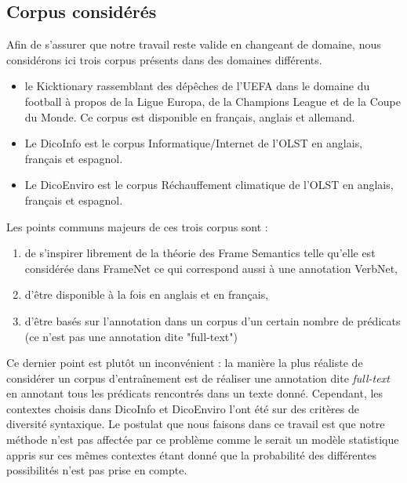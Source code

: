 \subsection{Corpus considérés}

Afin de s'assurer que notre travail reste valide en changeant de domaine, nous
considérons ici trois corpus présents dans des domaines différents.

\begin{itemize}

    \item le Kicktionary \citep{schmidt2009kicktionary} rassemblant des
        dépêches de l'UEFA dans le domaine du football à propos de la Ligue
        Europa, de la Champions League et de la Coupe du Monde. Ce corpus est
        disponible en français, anglais et allemand.

    \item Le DicoInfo est le corpus Informatique/Internet de l'OLST
        \citep{olstcorpus} en anglais, français et espagnol.

    \item Le DicoEnviro est le corpus Réchauffement climatique de l'OLST
        \citep{olstcorpus} en anglais, français et espagnol.

\end{itemize}

Les points communs majeurs de ces trois corpus sont :
\begin{enumerate}

    \item de s'inspirer librement de la théorie des Frame Semantics telle
        qu'elle est considérée dans FrameNet ce qui correspond aussi à une
        annotation VerbNet,

    \item d'être disponible à la fois en anglais et en français,

    \item d'être basés sur l'annotation dans un corpus d'un certain nombre de
        prédicats (ce n'est pas une annotation dite "full-text")

\end{enumerate}

Ce dernier point est plutôt un inconvénient : la manière la plus réaliste de
considérer un corpus d'entraînement est de réaliser une annotation dite
\textit{full-text} en annotant tous les prédicats rencontrés dans un texte
donné. Cependant, les contextes choisis dans DicoInfo et DicoEnviro l'ont été
sur des critères de diversité syntaxique. \citep{lhomme2012adding} Le postulat
que nous faisons dans ce travail est que notre méthode n'est pas affectée par
ce problème comme le serait un modèle statistique appris sur ces mêmes
contextes étant donné que la probabilité des différentes possibilités n'est pas
prise en compte.

